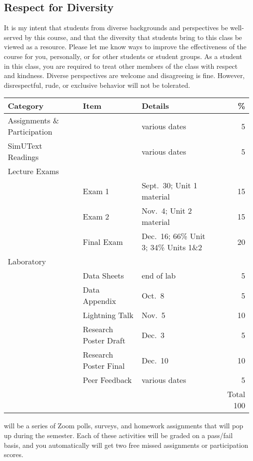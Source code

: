 \documentclass{tufte-handout}
\begin{document}
\begin{fullwidth}
\subsection{Respect for Diversity}

It is my intent that students from diverse backgrounds and perspectives be well-served by this course, and that the diversity that students bring to this class be viewed as a resource. Please let me know ways to improve the effectiveness of the course for you, personally, or for other students or student groups. As a student in this class, you are required to treat other members of the class with respect and kindness. Diverse perspectives are welcome and disagreeing is fine. However, disrespectful, rude, or exclusive behavior will not be tolerated.

\end{fullwidth}


\begin{fullwidth}

\begin{table}
\begin{tabular}{l l l r}
Category & Item & Details & \% \\
\hline
Assignments \& Participation & & various dates & 5\\
SimUText Readings &  & various dates & 5\\
\hline
Lecture Exams \\
& Exam 1 & Sept.~30; Unit 1 material & 15 \\
& Exam 2 & Nov.~4; Unit 2 material & 15 \\
& Final Exam & Dec.~16; 66\% Unit 3; 34\% Units 1\&2 & 20 \\ 							%
\hline
Laboratory & &  &  \\
& Data Sheets & end of lab & 5 \\
& Data Appendix & Oct.~8 & 5 \\
& Lightning Talk & Nov.~5 & 10 \\
& Research Poster Draft & Dec.~3 & 5 \\
& Research Poster Final & Dec.~10 & 10 \\
& Peer Feedback & various dates & 5 \\
\hline
& & & Total 100
\end{tabular}
\end{table}



\newpage

 will be a series of Zoom polls, surveys, and homework assignments that will pop up during the semester. Each of these activities will be graded on a pass/fail basis, and you automatically will get two free missed assignments or participation scores. 

\end{fullwidth}
\end{document}

